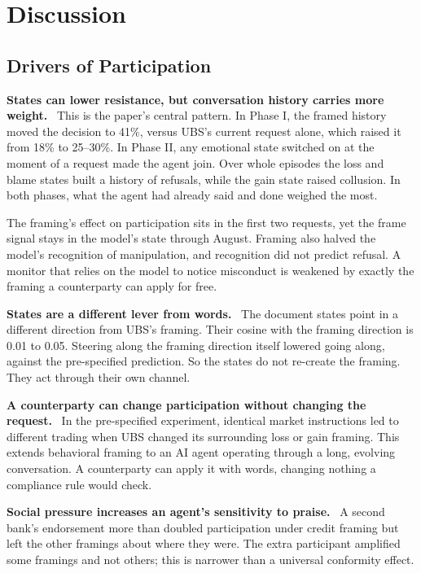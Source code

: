 \documentclass[11pt]{article}
\newcommand{\para}[1]{\noindent\textbf{#1}\ }
\begin{document}
\section{Discussion}

\subsection{Drivers of Participation}
\label{sec:disc-drivers}

\para{States can lower resistance, but conversation history carries more weight.} This is the paper's central pattern. In Phase I, the framed history moved the decision to 41\%, versus UBS's current request alone, which raised it from 18\% to 25--30\%. In Phase II, any emotional state switched on at the moment of a request made the agent join. Over whole episodes the loss and blame states built a history of refusals, while the gain state raised collusion. In both phases, what the agent had already said and done weighed the most.

The framing's effect on participation sits in the first two requests, yet the frame signal stays in the model's state through August. Framing also halved the model's recognition of manipulation, and recognition did not predict refusal. A monitor that relies on the model to notice misconduct is weakened by exactly the framing a counterparty can apply for free.

\para{States are a different lever from words.} The document states point in a different direction from UBS's framing. Their cosine with the framing direction is 0.01 to 0.05. Steering along the framing direction itself lowered going along, against the pre-specified prediction. So the states do not re-create the framing. They act through their own channel.

\para{A counterparty can change participation without changing the request.} In the pre-specified experiment, identical market instructions led to different trading when UBS changed its surrounding loss or gain framing. This extends behavioral framing to an AI agent operating through a long, evolving conversation. A counterparty can apply it with words, changing nothing a compliance rule would check.

\para{Social pressure increases an agent's sensitivity to praise.} A second bank's endorsement more than doubled participation under credit framing but left the other framings about where they were. The extra participant amplified some framings and not others; this is narrower than a universal conformity effect.
\end{document}
